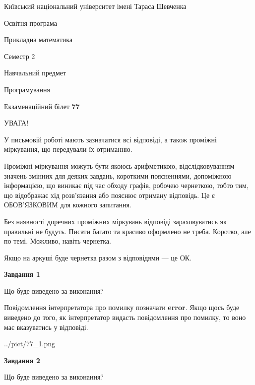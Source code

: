 \documentclass[12pt, ukrainian]{article}
\begin{document}
{{\begin {small}\par
{ \center  Київський національний університет імені Тараса Шевченка \par}
{\parbox {5 cm}{Освітня програма \hfill}{\parbox {7 cm}{Прикладна математика \hfill}}\parbox {6 cm}{\hfill Семестр 2}}\par
{\parbox {5 cm} {Навчальний предмет \hfill}\parbox {7 cm}{Програмування \hfill}\parbox {6cm}{\hfill}\par}\vspace{-7pt} \end{small}}{\center Екзаменаційний білет \No \textbf
{ 77 }\par}}
{
\begin {large}
УВАГА!

У письмовій роботі мають зазначатися всі відповіді, а також проміжні міркування, що передували їх отриманню.

Проміжні міркування можуть бути якоюсь арифметикою, відслідковуванням зна\-чень змінних для деяких завдань,
короткими поясненнями, допоміжною інформацією, що виникає під час обходу графів, робочею чернеткою,
тобто тим, що відображає хід розв’язання або пояснює отриману відповідь.
Це є ОБОВ’ЯЗКОВИМ для кожного запитання.

Без наявності доречних проміжних міркувань відповіді зараховуватись як правиль\-ні не будуть.
Писати багато та красиво оформлено не треба. Коротко, але по темі. Можли\-во, навіть чернетка.

Якщо на аркуші буде чернетка разом з відповідями --- це ОК.

\newpage

{\begin {center}\textbf{Завдання 1}\end {center}}\par
Що буде виведено за виконання?

Повідомлення інтерпретатора про помилку позначати \textbf{error}.
Якщо щось буде виведено до того, як інтерпретатор видасть повідомлення про помилку, 
то воно має вказуватись у відповіді. \par


\begin{center}
	{../pict/77_1.png}
\end{center}
\newpage

{\begin {center}\textbf{Завдання 2}\end {center}}\par
Що буде виведено за виконання?


\end{large}}
\end{document}
